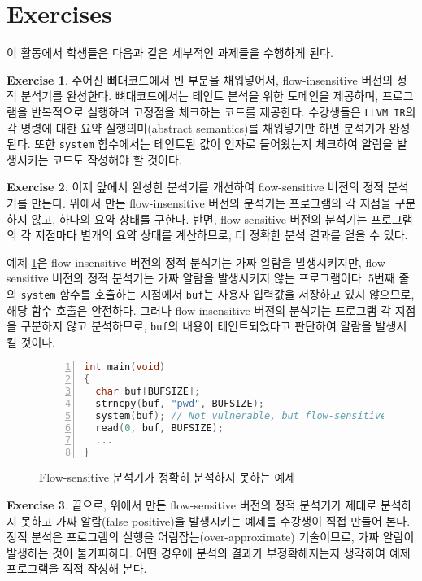 \documentclass[a4paper, 11pt]{article}
\theoremstyle{definition}
\newtheorem{exercise}{Exercise}
\begin{document}
\section{Exercises}

이 활동에서 학생들은 다음과 같은 세부적인 과제들을 수행하게 된다.

\begin{exercise} 
 주어진 뼈대코드에서 빈 부분을 채워넣어서, flow-insensitive 버전의 정적 분석기를 완성한다. 뼈대코드에서는 테인트 분석을 위한 도메인을 제공하며, 프로그램을 반복적으로 실행하며 고정점을 체크하는 코드를 제공한다. 수강생들은 \texttt{LLVM IR}의 각 명령에 대한 요약 실행의미(abstract semantics)를 채워넣기만 하면 분석기가 완성된다. 또한 \texttt{system} 함수에서는 테인트된 값이 인자로 들어왔는지 체크하여 알람을 발생시키는 코드도 작성해야 할 것이다.
\end{exercise}

\begin{exercise}
 이제 앞에서 완성한 분석기를 개선하여 flow-sensitive 버전의 정적 분석기를 만든다. 위에서 만든 flow-insensitive 버전의 분석기는 프로그램의 각 지점을 구분하지 않고, 하나의 요약 상태를 구한다. 반면, flow-sensitive 버전의 분석기는 프로그램의 각 지점마다 별개의 요약 상태를 계산하므로, 더 정확한 분석 결과를 얻을 수 있다.

예제  \ref{fig:example}은 flow-insensitive 버전의 정적 분석기는 가짜 알람을 발생시키지만, flow-sensitive 버전의 정적 분석기는 가짜 알람을 발생시키지 않는 프로그램이다. 5번째 줄의 \texttt{system} 함수를 호출하는 시점에서 \texttt{buf}는 사용자 입력값을 저장하고 있지 않으므로, 해당 함수 호출은 안전하다. 그러나 flow-insensitive 버전의 분석기는 프로그램 각 지점을 구분하지 않고 분석하므로, \texttt{buf}의 내용이 테인트되었다고 판단하여 알람을 발생시킬 것이다.

\begin{figure}
\begin{lstlisting}[language=C, frame=single, basicstyle=\footnotesize,
numbers=left, numbersep=1em, xleftmargin=2em, showstringspaces=false]
int main(void)
{
  char buf[BUFSIZE];
  strncpy(buf, "pwd", BUFSIZE);
  system(buf); // Not vulnerable, but flow-sensitive analyzer will raise alarm
  read(0, buf, BUFSIZE);
  ...
}
\end{lstlisting}
 \caption{Flow-sensitive 분석기가 정확히 분석하지 못하는 예제}
  \label{fig:example}
\end{figure}
\end{exercise}

\begin{exercise}
 끝으로, 위에서 만든 flow-sensitive 버전의 정적 분석기가 제대로 분석하지 못하고 가짜 알람(false positive)을 발생시키는 예제를 수강생이 직접 만들어 본다. 정적 분석은 프로그램의 실행을 어림잡는(over-approximate) 기술이므로, 가짜 알람이 발생하는 것이 불가피하다. 어떤 경우에 분석의 결과가 부정확해지는지 생각하여 예제 프로그램을 직접 작성해 본다.

\end{exercise}
\end{document}
